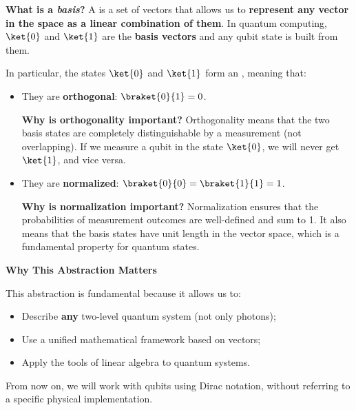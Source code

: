 \begin{itemize}
    \highspace
    \textcolor{Green3}{ \textbf{What is a \emph{basis}?}} A  is a set of vectors that allows us to \textbf{represent any vector in the space as a linear combination of them}. In quantum computing, $\ket{0}$ and $\ket{1}$ are the \textbf{basis vectors} and any qubit state is built from them.

    \highspace
    In particular, the states $\ket{0}$ and $\ket{1}$ form an , meaning that:
    \begin{itemize}
        \item They are \textbf{orthogonal}: $\braket{0}{1} = 0$.
        
        \textcolor{Green3}{ \textbf{Why is orthogonality important?}} Orthogonality means that the two basis states are completely distinguishable by a measurement (not overlapping). If we measure a qubit in the state $\ket{0}$, we will never get $\ket{1}$, and vice versa.


        \item They are \textbf{normalized}: $\braket{0}{0} = \braket{1}{1} = 1$.
        
        \textcolor{Green3}{ \textbf{Why is normalization important?}} Normalization ensures that the probabilities of measurement outcomes are well-defined and sum to 1. It also means that the basis states have unit length in the vector space, which is a fundamental property for quantum states.
    \end{itemize}
\end{itemize}

\newpage

\begin{flushleft}
    \textcolor{Green3}{ \textbf{Why This Abstraction Matters}}
\end{flushleft}
This abstraction is fundamental because it allows us to:
\begin{itemize}
    \item Describe \textbf{any} two-level quantum system (not only photons);
    \item Use a unified mathematical framework based on vectors;
    \item Apply the tools of linear algebra to quantum systems.
\end{itemize}
From now on, we will work with qubits using Dirac notation, without referring to a specific physical implementation.

